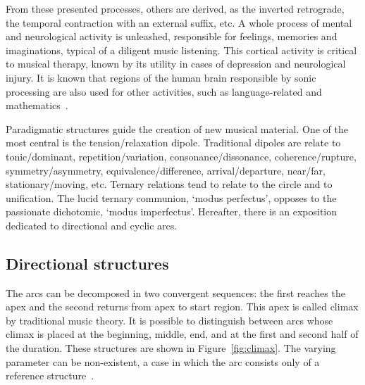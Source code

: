 From these presented processes, others are derived, as the inverted retrograde, the temporal contraction with an external suffix, etc. A whole process of mental and neurological activity is unleashed, responsible for feelings, memories and imaginations, typical of a diligent music listening. This cortical activity is critical to
musical therapy, known by its utility in cases of depression and neurological injury. It is known that regions of the human brain responsible by sonic processing are also used for other activities, such as language-related and mathematics~\cite{Sacks,Roederer}.

Paradigmatic structures guide the creation of new musical material.
One of the most central is the tension/relaxation dipole. Traditional dipoles are relate to tonic/dominant, repetition/variation,
consonance/dissonance, coherence/rupture, symmetry/asymmetry,
equivalence/difference, arrival/departure, near/far, stationary/moving,
etc. Ternary relations tend to relate to the circle and to unification. The
lucid ternary communion, `modus perfectus', opposes to the passionate
dichotomic, `modus imperfectus'. Hereafter, there is an exposition dedicated to
directional and cyclic arcs.



\subsection{Directional structures}\label{subsec:dir}

The arcs can be decomposed in two convergent sequences: the first reaches the apex and the second returns from apex to start region.
This apex is called climax by traditional music theory. It is
possible to distinguish between arcs whose climax is placed at the beginning, middle, end,
and at the first and second half of the duration. These structures are
shown in Figure~\ref{fig:climax}. The varying parameter can be non-existent, a case in which
the arc consists only of a reference structure~\cite{Schoenberg}.

